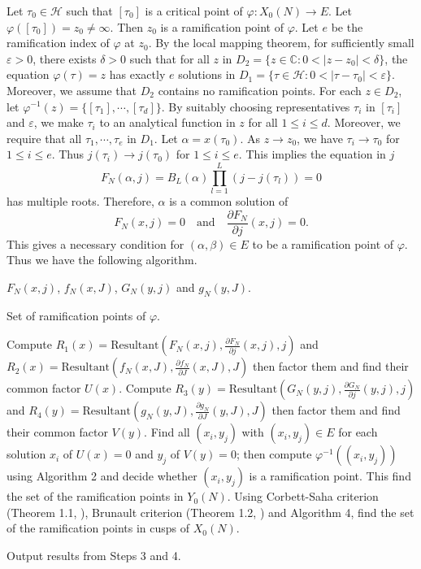 \documentclass[10pt, a4paper]{article}
\begin{document}
  Let $\tau_0 \in \mathcal{H}$ such that $[\tau_0]$ is a critical point of $\varphi: X_0(N) \to E$.
Let $\varphi([\tau_0]) = z_0\ne \infty$. Then  $z_0$ is a ramification  point of  $\varphi$. Let $e$ be the ramification index
of  $\varphi$ at $z_0$.
By the local mapping theorem,  for sufficiently small $\varepsilon > 0$, there exists $\delta > 0$ such that
for all $z$ in $D_2 = \{z \in \mathbb{C}: 0 < |z - z_0| < \delta\}$,
the equation $\varphi(\tau) = z$ has exactly $e$ solutions in $D_1 = \{\tau \in \mathcal{H}: 0 < |\tau - \tau_0| < \varepsilon\}$.
Moreover, we assume that  $D_2$ contains no ramification points.
For each $z \in D_2$,  let $\varphi^{-1}(z) = \{[\tau_1], \cdots, [\tau_d]\}$.
By suitably choosing  representatives $\tau_i$  in $[\tau_i]$ and $\varepsilon$,
we make  $\tau_i$ to an analytical function in $z$ for all $1 \leqslant i \leqslant d$.
Moreover, we  require that all  $\tau_1, \cdots, \tau_e$  in $D_1$.
Let $\alpha = x(\tau_0)$.
 As $z \to z_0$, we have $\tau_i \to \tau_0$ for $1 \leq i \leq e$.
 Thus $j(\tau_i) \to j(\tau_0)$ for $1 \leq i \leq e$.
 This implies the equation in $j$
\[ F_N(\alpha, j) = B_L(\alpha) \prod_{l=1}^L (j - j(\tau_l)) = 0 \]
has multiple roots.
Therefore, $\alpha$  is a common solution of
\[ F_N(x,j) = 0 \quad \text{and} \quad \frac{\partial F_N}{\partial j}(x,j) = 0. \]
This gives a necessary condition for $(\alpha ,\beta ) \in E$  to be a ramification point of $\varphi$.
Thus we have the following algorithm.
\begin{algorithm}[H]
\caption{Algorithm for Finding Ramification Points}
\begin{algorithmic}[1]
\REQUIRE
 $F_N(x,j)$, $f_N(x,J)$,  $G_N(y,j)$ and $g_N(y,J)$.

\ENSURE  Set of ramification points of $\varphi$.

\STATE  Compute
$R_1(x) =\text{Resultant}(F_N(x,j), \frac{\partial F_N}{\partial j}(x,j), j)$  and
$R_2(x) = \text{Resultant}(f_N(x,J), \frac{\partial f_N}{\partial J}(x,J), J) $ then
factor them and find their common factor $U(x)$.
\STATE  Compute
$ R_3(y) = \text{Resultant}(G_N(y,j), \frac{\partial G_N}{\partial j}(y,j), j) $  and
$R_4(y) = \text{Resultant}(g_N(y,J), \frac{\partial g_N}{\partial J}(y,J), J) $ then
factor  them and find their common factor $V(y)$.
\STATE  Find  all  $(x_i,y_j)$  with $(x_i,y_j) \in E$
for each solution $x_i$  of $U(x)=0$ and  $y_j$ of  $V(y)=0$;
then  compute $\varphi^{-1}((x_i,y_j))$ using Algorithm 2
and decide whether  $(x_i,y_j)$ is a ramification point.
 This  find the set of the ramification points in $Y_0(N)$.
\STATE
Using Corbett-Saha criterion (Theorem 1.1, \cite{Corbett-Saha}),
Brunault criterion (Theorem 1.2, \cite{Brunault}) and
Algorithm 4,  find the set of the ramification  points in cusps of $X_0(N)$.

\STATE  Output results from Steps 3 and 4.
\end{algorithmic}
\end{algorithm}
\end{document}
